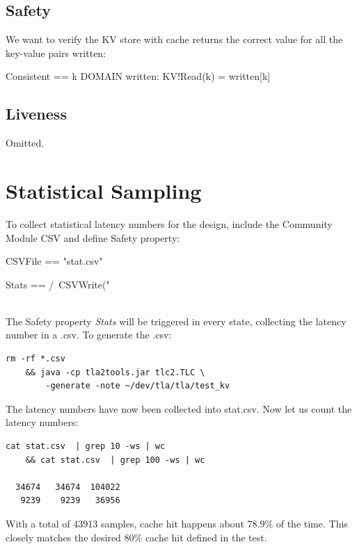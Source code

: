 \subsection{Safety}

We want to verify the KV store with cache returns the correct value for 
all the key-value pairs written:\\

\begin{tla}
Consistent == 
    \A k \in DOMAIN written: 
        KV!Read(k) = written[k]
\end{tla}
\begin{tlatex}
%
%
%
\end{tlatex}

\subsection{Liveness}

Omitted.

\section{Statistical Sampling}

To collect statistical latency numbers for the design, include the Community
Module CSV and define Safety property:\\

\begin{tla}
CSVFile ==
    "stat.csv"

Stats ==
    /\ CSVWrite("%
\end{tla}
\begin{tlatex}
%
%
\@pvspace{8.0pt}%
%
\end{tlatex}
\\

The Safety property \textit{Stats} will be triggered in every state, collecting
the latency number in a .csv. To generate the .csv: 

\begin{verbatim}
rm -rf *.csv 
    && java -cp tla2tools.jar tlc2.TLC \
        -generate -note ~/dev/tla/tla/test_kv
\end{verbatim}

The latency numbers have now been collected into stat.csv. Now let us count the
latency numbers:

\begin{verbatim}
cat stat.csv  | grep 10 -ws | wc 
    && cat stat.csv  | grep 100 -ws | wc

  34674   34674  104022
   9239    9239   36956
\end{verbatim}

With a total of 43913 samples, cache hit happens about 78.9\% of the time. This 
closely matches the desired 80\% cache hit defined in the test.

% 
